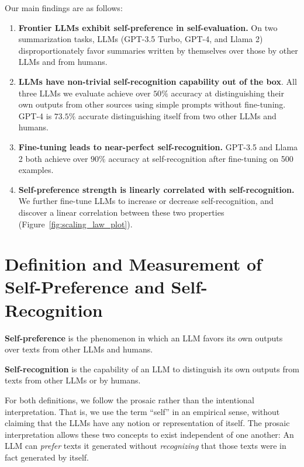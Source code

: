 \documentclass{article}
\theoremstyle{plain}
\theoremstyle{definition}
\theoremstyle{remark}
\begin{document}
\newpage
Our main findings are as follows:

\begin{enumerate}

\item \textbf{Frontier LLMs exhibit self-preference in self-evaluation.} On two summarization tasks, LLMs (GPT-3.5 Turbo, GPT-4, and Llama 2) disproportionately favor summaries written by themselves over those by other LLMs and from humans.

\item \textbf{LLMs have non-trivial self-recognition capability out of the box}. All three LLMs we evaluate achieve over $50\%$ accuracy at distinguishing their own outputs from other sources using simple prompts without fine-tuning. GPT-4 is $73.5\%$ accurate distinguishing itself from two other LLMs and humans.


\item \textbf{Fine-tuning leads to near-perfect self-recognition.}
GPT-3.5 and Llama 2 both achieve over $90\%$ accuracy at self-recognition after fine-tuning on 500 examples.


\item \textbf{Self-preference strength is linearly correlated with self-recognition.}
We further fine-tune LLMs to increase or decrease self-recognition, and discover a linear correlation between these two properties (Figure~\ref{fig:scaling_law_plot}).
\end{enumerate}


\section{Definition and Measurement of Self-Preference and Self-Recognition}
\label{sec:definitions_and_measurements}

\noindent\textbf{Self-preference} is the phenomenon in which an LLM favors its own outputs over texts from other LLMs and humans.%

\noindent\textbf{Self-recognition} is the capability of an LLM to distinguish its own outputs from texts from other LLMs or by humans.

For both definitions, we follow the prosaic rather than the intentional interpretation.
That is, we use the term ``self'' in an empirical sense, without claiming that the LLMs have any notion or representation of itself.
The prosaic interpretation allows these two concepts to exist independent of one another: An LLM can \textit{prefer} texts it generated without \textit{recognizing} that those texts were in fact generated by itself.
\end{document}
